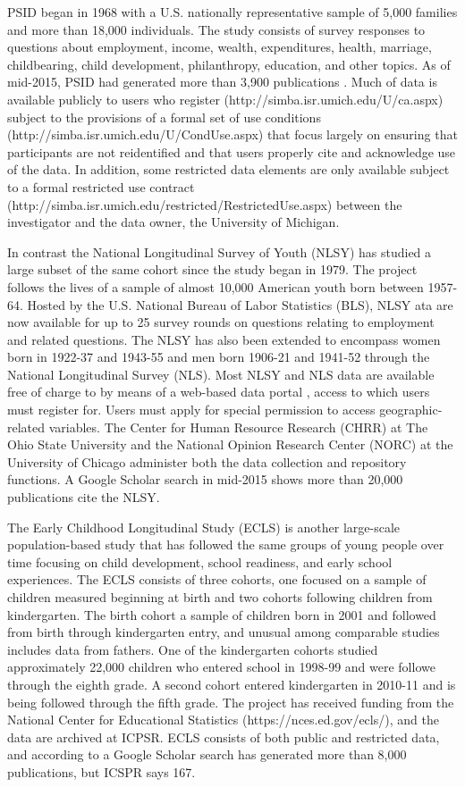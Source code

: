 \documentclass[letterpaper,man,apacite]{apa6}
\begin{document}
PSID began in 1968 with a U.S. nationally representative sample of 5,000 families and more than 18,000 individuals.
The study consists of survey responses to questions about employment, income, wealth, expenditures, health, marriage, childbearing, child development, philanthropy, education, and other topics. As of mid-2015, PSID had generated more than 3,900 publications \cite{PSID_pubs}. 
Much of data is available publicly to users who register (http://simba.isr.umich.edu/U/ca.aspx) subject to the provisions of a formal set of use conditions (http://simba.isr.umich.edu/U/CondUse.aspx) that focus largely on ensuring that participants are not reidentified and that users properly cite and acknowledge use of the data. 
In addition, some restricted data elements are only available subject to a formal restricted use contract (http://simba.isr.umich.edu/restricted/RestrictedUse.aspx) between the investigator and the data owner, the University of Michigan.

In contrast the National Longitudinal Survey of Youth (NLSY) \cite{NLSY} has studied a large subset of the same cohort since the study began in 1979.
The project follows the lives of a sample of almost 10,000 American youth born between 1957-64.
Hosted by the U.S. National Bureau of Labor Statistics (BLS), NLSY ata are now available for up to 25 survey rounds on questions relating to employment and related questions.
The NLSY has also been extended to encompass women born in 1922-37 and 1943-55 and men born 1906-21 and 1941-52 through the National Longitudinal Survey (NLS).
Most NLSY and NLS data are available free of charge to by means of a web-based data portal \cite{NLSY_data}, access to which users must register for.
Users must apply for special permission to access geographic-related variables.
The Center for Human Resource Research (CHRR) at The Ohio State University and the National Opinion Research Center (NORC) at the University of Chicago administer both the data collection and repository functions.
A Google Scholar search in mid-2015 shows more than 20,000 publications cite the NLSY.

The Early Childhood Longitudinal Study (ECLS) is another large-scale population-based study that has followed the same groups of young people over time focusing on child development, school readiness, and early school experiences. 
The ECLS consists of three cohorts, one focused on a sample of children measured beginning at birth and two cohorts following children from kindergarten.
The birth cohort a sample of children born in 2001 and followed from birth through kindergarten entry, and unusual among comparable studies includes data from fathers. 
One of the kindergarten cohorts studied approximately 22,000 children who entered school in 1998-99 and were followe through the eighth grade. 
A second cohort entered kindergarten in 2010-11 and is being followed through the fifth grade.
The project has received funding from the National Center for Educational Statistics (https://nces.ed.gov/ecls/), and the data are archived at ICPSR.
ECLS consists of both public and restricted data, and according to a Google Scholar search has generated more than 8,000 publications, but ICSPR says 167.
\end{document}
